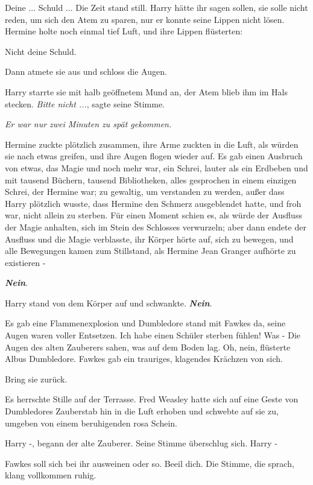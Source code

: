 \glqq{}Deine ... Schuld ...\grqq{} Die Zeit stand still. Harry hätte ihr sagen
sollen, sie solle nicht reden, um sich den Atem zu sparen, nur er konnte seine
Lippen nicht lösen. Hermine holte noch einmal tief Luft, und ihre Lippen
flüsterten:

\glqq{}Nicht deine Schuld.\grqq{}

Dann atmete sie aus und schloss die Augen.

Harry starrte sie mit halb geöffnetem Mund an, der Atem blieb ihm im Hals
stecken. \glqq{}\emph{Bitte nicht ...}\grqq{}, sagte seine Stimme.

\emph{Er war nur zwei Minuten zu spät gekommen.}

Hermine zuckte plötzlich zusammen, ihre Arme zuckten in die Luft, als würden sie
nach etwas greifen, und ihre Augen flogen wieder auf. Es gab einen Ausbruch von
etwas, das Magie und noch mehr war, ein Schrei, lauter als ein Erdbeben und mit
tausend Büchern, tausend Bibliotheken, alles gesprochen in einem einzigen
Schrei, der Hermine war; zu gewaltig, um verstanden zu werden, außer dass Harry
plötzlich wusste, dass Hermine den Schmerz ausgeblendet hatte, und froh war,
nicht allein zu sterben. Für einen Moment schien es, als würde der Ausfluss der
Magie anhalten, sich im Stein des Schlosses verwurzeln; aber dann endete der
Ausfluss und die Magie verblasste, ihr Körper hörte auf, sich zu bewegen, und
alle Bewegungen kamen zum Stillstand, als Hermine Jean Granger aufhörte zu
existieren -

\textbf{\emph{Nein}}.

Harry stand von dem Körper auf und schwankte.
\textbf{}
\textbf{\emph{Nein}}.

Es gab eine Flammenexplosion und Dumbledore stand mit Fawkes da, seine Augen
waren voller Entsetzen. \glqq{}Ich habe einen Schüler sterben fühlen! Was
-\grqq{} Die Augen des alten Zauberers sahen, was auf dem Boden lag. \glqq{}Oh,
nein\grqq{}, flüsterte Albus Dumbledore. Fawkes gab ein trauriges, klagendes
Krächzen von sich.

\glqq{}Bring sie zurück.\grqq{}

Es herrschte Stille auf der Terrasse. Fred Weasley hatte sich auf eine Geste von
Dumbledores Zauberstab hin in die Luft erhoben und schwebte auf sie zu, umgeben
von einem beruhigenden rosa Schein.

\glqq{}Harry -\grqq{}, begann der alte Zauberer. Seine Stimme überschlug sich.
\glqq{}Harry -\grqq{}

\glqq{}Fawkes soll sich bei ihr ausweinen oder so. Beeil dich.\grqq{} Die Stimme,
die sprach, klang vollkommen ruhig.

